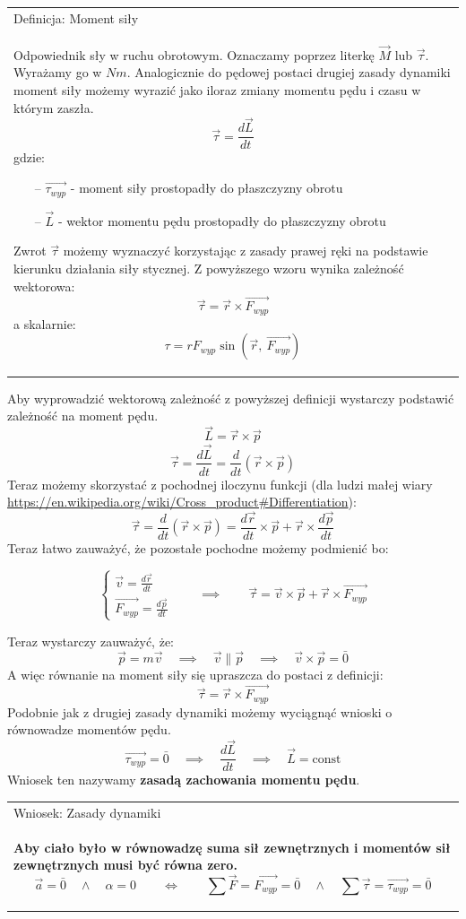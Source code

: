 \documentclass[a4paper]{article}
\newenvironment{definition}[2][Definicja]
    {
        \begin{center}
        \begin{tabular}{|p{1\textwidth}|}
        \hline
            #1: #2\\[2ex]
        \begin{em}
        \Large
    }
    { 
        \end{em}
        \\\hline
        \end{tabular} 
        \end{center}
    }
\begin{document}
    \begin{definition}{Moment siły}
        Odpowiednik sły w ruchu obrotowym. Oznaczamy poprzez literkę $\vec{M}$ lub $\vec{\tau}$.
        Wyrażamy go w $Nm$. Analogicznie do pędowej postaci drugiej zasady dynamiki moment siły możemy
        wyrazić jako iloraz zmiany momentu pędu i czasu w którym zaszła.
        \[\vec{\tau} = \frac{d\vec{L}}{dt}\]
        gdzie:
        \begin{itemize}
            \item[--] $\vec{\tau_{wyp}}$ - moment siły prostopadły do płaszczyzny obrotu
            \item[--] $\vec{L}$ - wektor momentu pędu prostopadły do płaszczyzny obrotu
        \end{itemize}
        Zwrot $\vec{\tau}$ możemy wyznaczyć korzystając z zasady prawej ręki na podstawie kierunku działania
        siły stycznej. Z powyższego wzoru wynika zależność wektorowa:
        \[\vec{\tau} = \vec{r} \times \vec{F_{wyp}}\]
        a skalarnie:
        \[\tau = rF_{wyp}\sin(\vec{r},\ \vec{F_{wyp}})\]
    \end{definition}
    Aby wyprowadzić wektorową zależność z powyższej definicji wystarczy podstawić zależność na moment pędu.
    \[\vec{L} = \vec{r} \times \vec{p}\]
    \[\vec{\tau} = \frac{d\vec{L}}{dt} = \frac{d}{dt}\left( \vec{r} \times \vec{p} \right)\]
    Teraz możemy skorzystać z pochodnej iloczynu funkcji (dla ludzi małej wiary 
    \url{https://en.wikipedia.org/wiki/Cross_product#Differentiation}):
    \[\vec{\tau} = \frac{d}{dt}\left( \vec{r} \times \vec{p} \right) = 
    \frac{d\vec{r}}{dt}\times\vec{p} + \vec{r} \times \frac{d\vec{p}}{dt}\]
    Teraz łatwo zauważyć, że pozostałe pochodne możemy podmienić bo:

    \[\begin{cases}
        \vec{v} = \frac{d\vec{r}}{dt} \\
        \vec{F_{wyp}} = \frac{d\vec{p}}{dt}
    \end{cases} \qquad\implies\qquad \vec{\tau} = \vec{v} \times \vec{p} + \vec{r}\times\vec{F_{wyp}}\]

    Teraz wystarczy zauważyć, że: 
    \[\vec{p} = m\vec{v} \quad\implies\quad \vec{v} \parallel \vec{p} \quad\implies\quad 
    \vec{v} \times \vec{p} = \bar{0}\]
    A więc równanie na moment siły się upraszcza do postaci z definicji:
    \[\vec{\tau} = \vec{r}\times\vec{F_{wyp}}\]
    Podobnie jak z drugiej zasady dynamiki możemy wyciągnąć wnioski o równowadze momentów pędu.
    \[\vec{\tau_{wyp}} = \bar{0} \quad\implies\quad \frac{d\vec{L}}{dt} \quad\implies\quad \vec{L} 
    = \text{const}\]
    Wniosek ten nazywamy \textbf{zasadą zachowania momentu pędu}.

    \begin{definition}[Wniosek]{Zasady dynamiki}
        \textbf{Aby ciało było w równowadzę suma sił zewnętrznych i momentów sił zewnętrznych
        musi być równa zero.}
        \[\vec{a} = \bar{0} \quad\land\quad \alpha = 0 \qquad\iff\qquad 
        \sum \vec{F} = \vec{F_{wyp}} = \bar{0}
        \quad\land\quad \sum \vec{\tau} = \vec{\tau_{wyp}} = \bar{0} \]
    \end{definition}
    
\end{document}
